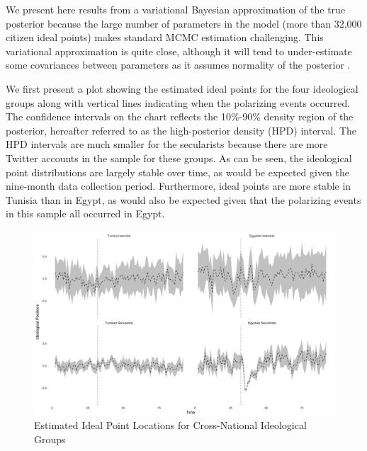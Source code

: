 \documentclass[12pt]{article}
\begin{document}
We present here results from a variational Bayesian approximation of the true posterior \parencite{NIPS2015_5758} because the large number of parameters in the model (more than 32,000 citizen ideal points) makes standard MCMC estimation challenging. This variational approximation is quite close, although it will tend to under-estimate some covariances between parameters as it assumes normality of the posterior \parencite{NIPS2015_5758}. 

We first present a plot showing the estimated ideal points for the four ideological groups along with vertical lines indicating when the polarizing events occurred. The confidence intervals on the chart reflects the 10\%-90\% density region of the posterior, hereafter referred to as the high-posterior density (HPD) interval. The HPD intervals are much smaller for the secularists because there are more Twitter accounts in the sample for these groups. As can be seen, the ideological point distributions are largely stable over time, as would be expected given the nine-month data collection period. Furthermore, ideal points are more stable in Tunisia than in Egypt, as would also be expected given that the polarizing events in this sample all occurred in Egypt. 
 \begin{figure}[!h]
	\caption{Estimated Ideal Point Locations for Cross-National Ideological Groups}\label{arab_id_facet}
	\centering
	\includegraphics[width=.9\linewidth]{arab_ideology}
\end{figure}


\printbibliography
\end{document}
